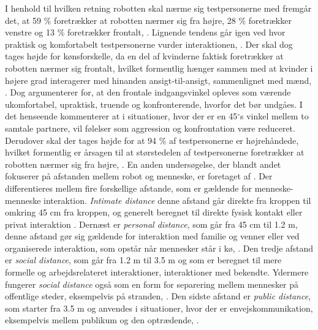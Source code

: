I henhold til hvilken retning robotten skal nærme sig testpersonerne med fremgår det, at 59 \% foretrækker at robotten nærmer sig fra højre, 28 \% foretrækker venstre og 13 \% foretrækker frontalt, \parencite[s. 175]{PDF:HowMayIServeYou}. Lignende tendens går igen ved hvor praktisk og komfortabelt testpersonerne vurder interaktionen, \parencite[ss. 175-176]{PDF:HowMayIServeYou}. Der skal dog tages højde for kønsforskelle, da en del af kvinderne faktisk foretrækker at robotten nærmer sig frontalt, hvilket formentlig hænger sammen med at kvinder i højere grad interagerer med hinanden ansigt-til-ansigt, sammenlignet med mænd, \parencite[s. 178]{PDF:HowMayIServeYou}. Dog argumenterer \textcite[s. 178]{PDF:HowMayIServeYou} for, at den frontale indgangsvinkel opleves som værende ukomfortabel, upraktisk, truende og konfronterende, hvorfor det bør undgåes. I det henseende kommenterer \textcite[s. 178]{PDF:HowMayIServeYou} at i situationer, hvor der er en 45$^{\circ}$s vinkel mellem to samtale partnere, vil følelser som aggression og konfrontation være reduceret. Derudover skal der tages højde for at 94 \% af testpersonerne er højrehåndede, hvilket formentlig er årsagen til at størstedelen af testpersonerne foretrækker at robotten nærmer sig fra højre, \parencite[s. 175]{PDF:HowMayIServeYou}.\blankline
%
En anden undersøgelse, der blandt andet fokuserer på afstanden mellem robot og menneske, er foretaget af \textcite{PDF:HumanRobotEmodiedInteraction}. Der differentieres mellem fire forskellige afstande, som er gældende for menneske-menneske interaktion. \textit{Intimate distance} denne afstand går direkte fra kroppen til omkring 45 cm fra kroppen, og generelt beregnet til direkte fysisk kontakt eller privat interaktion \parencite[s. 165]{PDF:HumanRobotEmodiedInteraction}. Dernæst er \textit{personal distance}, som går fra 45 cm til 1.2 m, denne afstand gør sig gældende for interaktion med familie og venner eller ved organiserede interaktion, som opstår når mennesker står i kø, \parencite[s. 165]{PDF:HumanRobotEmodiedInteraction}. Den tredje afstand er \textit{social distance}, som går fra 1.2 m til 3.5 m og som er beregnet til mere formelle og arbejdsrelateret interaktioner, interaktioner med bekendte. Ydermere fungerer \textit{social distance} også som en form for separering mellem mennesker på offentlige steder, eksempelvis på stranden, \parencite[s. 165]{PDF:HumanRobotEmodiedInteraction}. Den sidste afstand er \textit{public distance}, som starter fra 3.5 m og anvendes i situationer, hvor der er envejskommunikation, eksempelvis mellem publikum og den optrædende, \parencite[s. 165]{PDF:HumanRobotEmodiedInteraction}.

